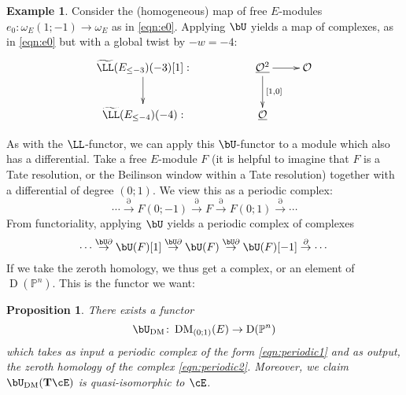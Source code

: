 \documentclass[12pt]{amsart}
\newtheorem{prop}[lemma]{Proposition}
\theoremstyle{definition}
\newtheorem{example}[lemma]{Example}
\theoremstyle{remark}
\newcommand{\Tate}{{\mathbf{T}}}
\newcommand{\PP}{\mathbb P}
\newcommand{\cO}{{\mathcal O}}
\def\DD{\operatorname{D}}
\def\DM{\operatorname{DM}}
\begin{document}
\begin{example}
Consider the (homogeneous) map of free $E$-modules $e_0: \omega_E(1;-1)\to \omega_E$ as in \eqref{eqn:e0}.  Applying $\bU$ yields a map of complexes, as in \eqref{eqn:e0} but with a global twist by $-w=-4$:
\begin{equation}\label{eqn:e0'}
\xymatrix{
\widetilde{\LL}(E_{\leq -3})(-3)[1]:\ar[d]&&\underline{\cO^2} \ar[r]\ar[d]^{[1,0]}&\cO\\
\widetilde{\LL}(E_{\leq -4})(-4):&&\underline{\cO}&
}
\end{equation}
\end{example}


As with the $\LL$-functor, we can apply this $\bU$-functor to a module which also has a differential.  Take a free $E$-module $F$ (it is helpful to imagine that $F$ is a Tate resolution, or the Beilinson window within a Tate resolution) together with a differential of degree $(0;1)$.  We  view this as a periodic complex:
\begin{equation}\label{eqn:periodic1}
\cdots \overset{\partial}{\to} F(0;-1) \overset{\partial}{\to} F \overset{\partial}{\to} F(0;1) \overset{\partial}{\to} \cdots
\end{equation}
From functoriality, applying $\bU$ yields a periodic complex of complexes
\begin{equation}\label{eqn:periodic2}
\cdots \overset{\bU\partial}{\to} \bU(F)[1] \overset{\bU\partial}{\to} \bU(F) \overset{\bU\partial}{\to} \bU(F)[-1] \overset{\partial}{\to} \cdots
\end{equation}
If we take the zeroth homology, we thus get a complex, or an element of $\DD(\PP^n)$.  This is the functor we want:
\begin{prop}
There exists a functor
\[
\bU_{\DM} \colon \DM_{(0;1)}(E)\to \DD(\PP^n)
\]
which takes as input a periodic complex of the form \eqref{eqn:periodic1} and as output, the zeroth homology of the complex \eqref{eqn:periodic2}.  Moreover, we claim $\bU_{\DM} (\Tate \cE)$ is quasi-isomorphic to $\cE$.
\end{prop}
\end{document}
